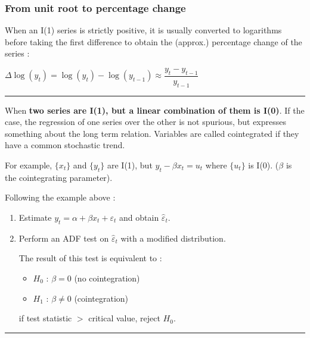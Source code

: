 \begin{f}
\subsubsection*{From unit root to percentage change}

When an I(1) series is strictly positive, it is usually converted to logarithms before taking the first difference to obtain the (approx.) percentage change of the series :

\begin{center}
	$\Delta \log(y_{t}) = \log(y_{t}) - \log(y_{t - 1}) \approx \dfrac{y_t - y_{t - 1}} {y_{t - 1}}$
\end{center}

		\end{f}  \hrule

  \begin{f}[Cointegration]

When \textbf{two series are I(1), but a linear combination of them is I(0)}. If the case, the regression of one series over the other is not spurious, but expresses something about the long term relation. Variables are called cointegrated if they have a common stochastic trend.

For example, $\lbrace x_{t} \rbrace$ and $\lbrace y_{t} \rbrace$ are I(1), but $y_{t} - \beta x_{t} = u_{t}$ where $\lbrace u_{t} \rbrace$ is I(0). ($\beta$ is the cointegrating parameter).

\end{f}  

\begin{f}

Following the example above :

\begin{enumerate}[leftmargin=*]
	\item Estimate $y_{t} = \alpha + \beta x_{t} + \varepsilon_{t}$ and obtain $\hat{\varepsilon}_{t}$.
	\item Perform an ADF test on $\hat{\varepsilon}_{t}$ with a modified distribution.
	
	The result of this test is equivalent to :
	
	\begin{itemize}[leftmargin=*]
		\item $H_{0}$ : $\beta = 0$ (no cointegration)
		\item $H_{1}$ : $\beta \neq 0$ (cointegration)
	\end{itemize}
	
	if test statistic $>$ critical value, reject $H_0$.
\end{enumerate}

\end{f}  \hrule

